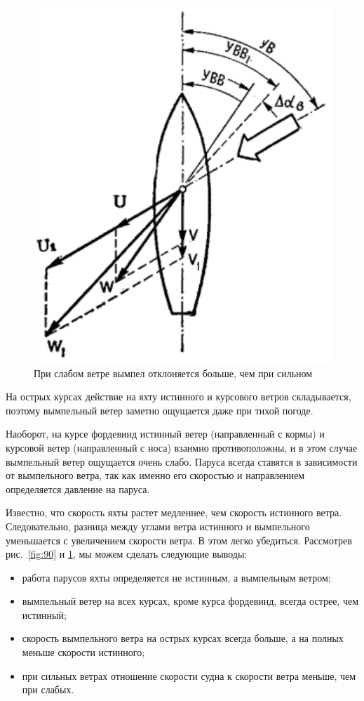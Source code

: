 \documentclass[a4paper, 12pt, twoside, final]{scrbook}
\begin{document}
\begin{figure}
	\centering
	\includegraphics[scale=0.8]{91_Vymple}
	\caption{При слабом ветре вымпел отклоняется больше, чем при сильном}
	\label{fig:91}
\end{figure}

На острых курсах действие на яхту истинного и курсового ветров складывается, поэтому вымпельный ветер заметно ощущается даже при тихой погоде.

Наоборот, на курсе фордевинд истинный ветер (направленный с кормы) и курсовой ветер (направленный с носа) взаимно противоположны, и в этом случае вымпельный ветер ощущается очень слабо. Паруса всегда ставятся в зависимости от вымпельного ветра, так как именно его скоростью и направлением определяется давление на паруса.

Известно, что скорость яхты растет медленнее, чем скорость истинного ветра. Следовательно, разница между углами ветра истинного и вымпельного уменьшается с увеличением скорости ветра. В этом легко убедиться. Рассмотрев рис.~\ref{fig:90} и \ref{fig:91}, мы можем сделать следующие выводы:

\begin{itemize}
\item работа парусов яхты определяется не истинным, а вымпельным ветром;
\item вымпельный ветер на всех курсах, кроме курса фордевинд, всегда острее, чем истинный;
\item скорость вымпельного ветра на острых курсах всегда больше, а на полных меньше скорости истинного;
\item при сильных ветрах отношение скорости судна к скорости ветра меньше, чем при слабых.
\end{itemize}
\end{document}
